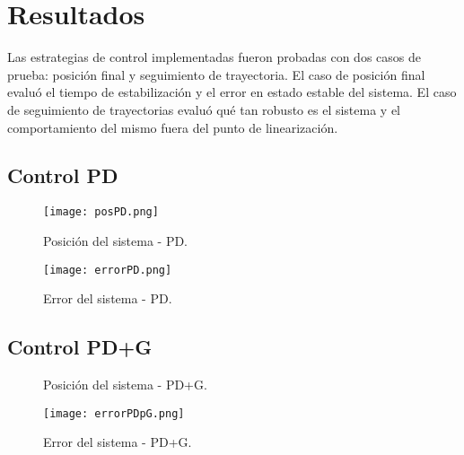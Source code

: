 % 
% 


\section{Resultados}

Las estrategias de control implementadas fueron probadas con dos casos de prueba: posición final y seguimiento de trayectoria.
El caso de posición final evaluó el tiempo de estabilización y el error en estado estable del sistema.
El caso de seguimiento de trayectorias evaluó qué tan robusto
es el sistema y el comportamiento del mismo fuera del punto de linearización.

\subsection{Control PD}

\begin{figure}
    \centering
    \texttt{[image: posPD.png]}
    \caption{Posición del sistema - PD.}
    \label{fig:PD position}
\end{figure}

\begin{figure}
    \centering
    \texttt{[image: errorPD.png]}
    \caption{Error del sistema - PD.}
    \label{fig:PD error}
\end{figure}

\subsection{Control PD+G}

\begin{figure}
    \centering
    \caption{Posición del sistema - PD+G.}
    \label{fig:PDG position}
\end{figure}

\begin{figure}
    \centering
    \texttt{[image: errorPDpG.png]}
    \caption{Error del sistema - PD+G.}
    \label{fig:PDG error}
\end{figure}


